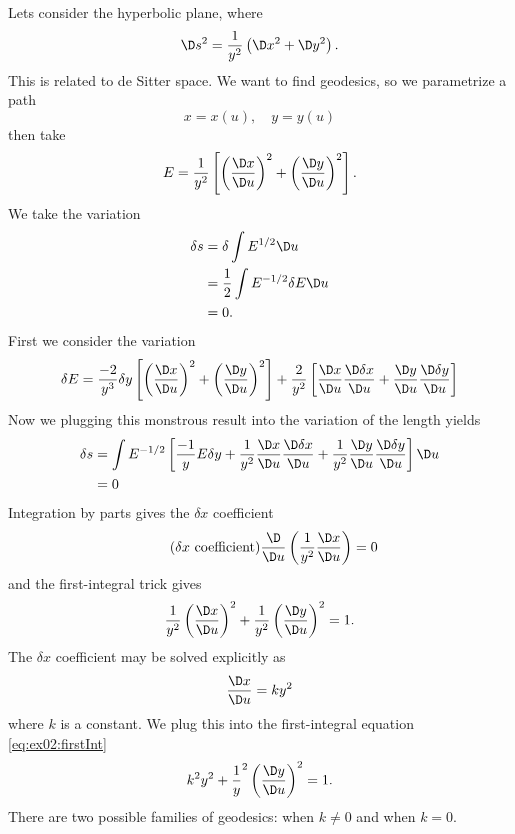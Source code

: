 \begin{ex}
Lets consider the hyperbolic plane, where
\begin{equation}
\D s^{2}=\frac{1}{y^{2}}\left(\D x^{2}+\D y^{2}\right).
\end{equation}
This is related to de Sitter space.
We want to find geodesics, so we parametrize a path
\begin{equation}
x=x(u),\quad y=y(u)
\end{equation}
then take
\begin{equation}
E=\frac{1}{y^{2}}\left[
\left(\frac{\D x}{\D u}\right)^{2}+
\left(\frac{\D y}{\D u}\right)^{2}
\right].
\end{equation}
We take the variation
\begin{equation}
\begin{split}
\delta s&=\delta\int E^{1/2}\D u\\
&=\frac{1}{2}\int E^{-1/2}\delta E\D u\\
&=0.
\end{split}
\end{equation}
First we consider the variation
\begin{equation}
\delta E=
\frac{-2}{y^{3}}\delta y\left[
\left(\frac{\D x}{\D u}\right)^{2}+
\left(\frac{\D y}{\D u}\right)^{2}
\right]
+\frac{2}{y^{2}}\left[
\frac{\D x}{\D u}\frac{\D\delta x}{\D u}+
\frac{\D y}{\D u}\frac{\D\delta y}{\D u}
\right]
\end{equation}
Now we plugging this monstrous result into the variation of the
length yields
\begin{equation}
\begin{split}
\delta s&=
\int
E^{-1/2}\left[
\frac{-1}{y}E\delta y
+\frac{1}{y^{2}}\frac{\D x}{\D u}\frac{\D\delta x}{\D u}+
\frac{1}{y^{2}}\frac{\D y}{\D u}\frac{\D\delta y}{\D u}
\right]\D u\\
&=0
\end{split}
\end{equation}
Integration by parts gives the $\delta x$ coefficient
\begin{equation*}\tag{$\delta x$\text{ coefficient}}
\frac{\D}{\D u}\left(\frac{1}{y^{2}}\frac{\D x}{\D u}\right)=0
\end{equation*}
and the first-integral trick gives
\begin{equation}\label{eq:ex02:firstInt}
\frac{1}{y^{2}}\left(\frac{\D x}{\D u}\right)^{2}+
\frac{1}{y^{2}}\left(\frac{\D y}{\D u}\right)^{2}=1.
\end{equation}
The $\delta x$ coefficient may be solved explicitly as
\begin{equation}
\frac{\D x}{\D u}=ky^{2}
\end{equation}
where $k$ is a constant. We plug this into the first-integral
equation \eqref{eq:ex02:firstInt}
\begin{equation}
k^{2}y^{2}+\frac{1}{y}^{2}\left(\frac{\D y}{\D u}\right)^{2}=1.
\end{equation}
There are two possible families of geodesics: when $k\not=0$ and
when $k=0$.


\end{ex}
